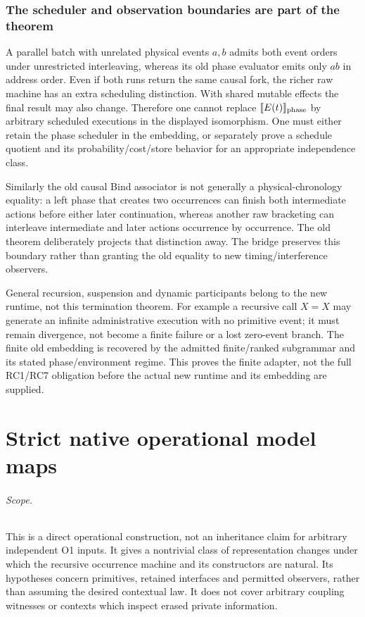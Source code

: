 \documentclass[11pt]{article}
\begin{document}
\section{The scheduler and observation boundaries are part of the theorem}
A parallel batch with unrelated physical events $a,b$ admits both event orders under unrestricted interleaving, whereas its old phase evaluator emits only $ab$ in address order. Even if both runs return the same causal fork, the richer raw machine has an extra scheduling distinction. With shared mutable effects the final result may also change. Therefore one cannot replace $\llbracket E(t)\rrbracket_{\rm phase}$ by arbitrary scheduled executions in the displayed isomorphism. One must either retain the phase scheduler in the embedding, or separately prove a schedule quotient and its probability/cost/store behavior for an appropriate independence class.

Similarly the old causal Bind associator is not generally a physical-chronology equality: a left phase that creates two occurrences can finish both intermediate actions before either later continuation, whereas another raw bracketing can interleave intermediate and later actions occurrence by occurrence. The old theorem deliberately projects that distinction away. The bridge preserves this boundary rather than granting the old equality to new timing/interference observers.

General recursion, suspension and dynamic participants belong to the new runtime, not this termination theorem. For example a recursive call $X=X$ may generate an infinite administrative execution with no primitive event; it must remain divergence, not become a finite failure or a lost zero-event branch. The finite old embedding is recovered by the admitted finite/ranked subgrammar and its stated phase/environment regime. This proves the finite adapter, not the full RC1/RC7 obligation before the actual new runtime and its embedding are supplied.

\part{Strict native operational model maps}

\paragraph{Scope.}
This is a direct operational construction, not an inheritance claim for arbitrary independent O1 inputs. It gives a nontrivial class of representation changes under which the recursive occurrence machine and its constructors are natural. Its hypotheses concern primitives, retained interfaces and permitted observers, rather than assuming the desired contextual law. It does not cover arbitrary coupling witnesses or contexts which inspect erased private information.
\end{document}
